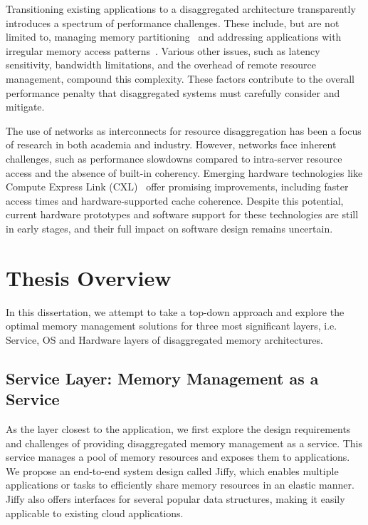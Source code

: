  Transitioning existing applications to a disaggregated architecture transparently introduces a spectrum of performance challenges. These include, but are not limited to, managing memory partitioning~\cite{jiffy} and addressing applications with irregular memory access patterns~\cite{chase}. Various other issues, such as latency sensitivity, bandwidth limitations, and the overhead of remote resource management, compound this complexity. These factors contribute to the overall performance penalty that disaggregated systems must carefully consider and mitigate.

 The use of networks as interconnects for resource disaggregation has been a focus of research in both academia and industry. However, networks face inherent challenges, such as performance slowdowns compared to intra-server resource access and the absence of built-in coherency. Emerging hardware technologies like Compute Express Link (CXL)~\cite{cxl, cxlasic, pond} offer promising improvements, including faster access times and hardware-supported cache coherence. Despite this potential, current hardware prototypes and software support for these technologies are still in early stages, and their full impact on software design remains uncertain.

\section{Thesis Overview}

In this dissertation, we attempt to take a top-down approach and explore the optimal memory management solutions for three most significant layers, i.e. Service, OS and Hardware layers of disaggregated memory architectures.

\subsection{Service Layer: Memory Management as a Service}
As the layer closest to the application, we first explore the design requirements and challenges of providing disaggregated memory management as a service. This service manages a pool of memory resources and exposes them to applications. We propose an end-to-end system design called Jiffy, which enables multiple applications or tasks to efficiently share memory resources in an elastic manner. Jiffy also offers interfaces for several popular data structures, making it easily applicable to existing cloud applications.

